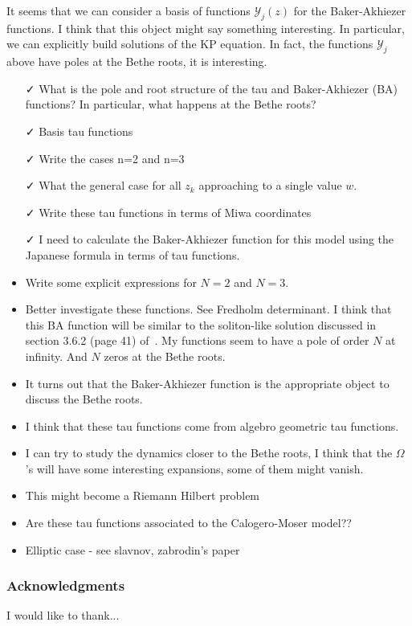 \documentclass[a4paper,11pt]{amsart}
\begin{document}
It seems that we can consider a basis of functions \(\mathcal{Y}_j(z)\) for the Baker-Akhiezer
functions. I think that this object might say something interesting. In particular, we can
explicitly build solutions of the KP equation. In fact, the functions \(\mathcal{Y}_j\)
above have poles at the Bethe roots, it is interesting. 
\begin{itemize}
\item[\faCheck] What is the pole and root structure of the tau and Baker-Akhiezer (BA) functions?
  In particular, what happens at the Bethe roots?
\item[\faCheck] Basis tau functions
\item[\faCheck] Write the cases n=2 and n=3
\item[\faCheck] What the general case for all \(z_k\) approaching to a single
  value \(w\). 
\item[\faCheck] Write these tau functions in terms of Miwa coordinates
\item[\faCheck] I need to calculate the Baker-Akhiezer function for this model using the Japanese formula
  in terms of tau functions.
\item Write some explicit expressions for \(N=2\) and \(N=3\). 
\item Better investigate these functions. See Fredholm determinant. 
  I think that this BA function will be similar to the soliton-like solution discussed in section 3.6.2 (page 41) of~\cite{Zabrodin2018}. 
  My functions seem to have a pole of order \(N\) at infinity. And \(N\) zeros at the Bethe roots. 
\item It turns out that the Baker-Akhiezer function is the appropriate object to discuss
  the Bethe roots. 
  \item I think that these tau functions come from algebro geometric tau functions. 
  \item I can try to study the dynamics closer to the Bethe roots, I think that the
    \(\Omega\)'s will have some interesting expansions, some of them might vanish. 
  \item This might become a Riemann Hilbert problem
  \item Are these tau functions associated to the Calogero-Moser model??
  \item Elliptic case - see slavnov, zabrodin's paper
\end{itemize}





\subsubsection*{Acknowledgments}
I would like to thank...

\printbibliography
\end{document}
